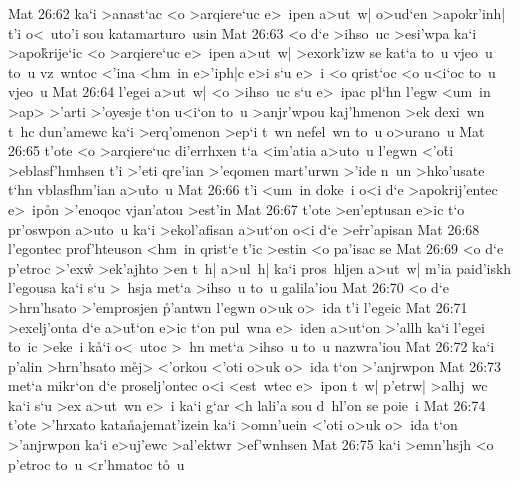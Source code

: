 \vs Mat 26:62
ka`i
>anast`ac
<o
>arqiere`uc
e>~ipen
a>ut~w|
o>ud`en
>apokr'inh|
t'i
o<~uto'i
sou
katamarturo~usin\bibvsend
\vs Mat 26:63
<o
d`e
>ihso~uc
>esi'wpa
ka`i
>apo\r{k}rije`ic
<o
>arqiere`uc
e>~ipen
a>ut~w|
>exork'izw
se
kat`a
to~u
vjeo~u
to~u
vz~wntoc
<'ina
<hm~in
e>'iph|c
e>i
s`u
e>~i
<o
qrist`oc
<o
u<i`oc
to~u
vjeo~u\bibvsend
\vs Mat 26:64
l'egei
a>ut~w|
<o
>ihso~uc
s`u
e>~ipac
pl`hn
l'egw
<um~in
>ap>
>'arti
>'oyesje
t`on
u<i`on
to~u
>anjr'wpou
kaj'hmenon
>ek
dexi~wn
t~hc
dun'amewc
ka`i
>erq'omenon
>ep`i
t~wn
nefel~wn
to~u
o>urano~u\bibvsend
\vs Mat 26:65
t'ote
<o
>arqiere`uc
di'errhxen
t`a
<im'atia
a>uto~u
l'egwn
<'o\r{t}i
>eblasf'hmhsen
t'i
>'eti
qre'ian
>'eqomen
mart'urwn
>'ide
n~un
>hko'usate
t`hn
vblasfhm'ian
a>u\r{t}o~u\bibvsend
{}
\vs Mat 26:66
t'i
<um~in
doke~i
o<i
d`e
>apokrij'entec
e>~ip\r{o}n
>'enoqoc
vjan'atou
>est'in\bibvsend
\vs Mat 26:67
t'ote
>en'eptusan
e>ic
t`o
pr'oswpon
a>uto~u
ka`i
>ekol'afisan
a>ut`on
o<i
d`e
>e\r{r}r'apisan\bibvsend
{}
\vs Mat 26:68
l'egontec
prof'hteuson
<hm~in
qrist`e
t'ic
>estin
<o
pa'isac
se\bibvsend
\vs Mat 26:69
<o
d`e
p'etroc
>'exw\r{}
>ek'ajhto
>en
t~h|
a>ul~h|
ka`i
pros~hljen
a>ut~w|
m'ia
paid'iskh
l'egousa
ka`i
s`u
>~hsja
met`a
>ihso~u
to~u
galila'iou\bibvsend
\vs Mat 26:70
<o
d`e
>hrn'hsato
>'emprosjen
\r{p}'antwn
l'egwn
o>uk
o>~ida
t'i
l'egeic\bibvsend
\vs Mat 26:71
>exelj'onta
d`e
a>u\r{t}`on
e>ic
t`on
pul~wna
e>~iden
a>ut`on
>'allh
ka`i
l'egei
\r{t}o~ic
>eke~i
k\r{a}`i
o<~utoc
>~hn
met`a
>ihso~u
to~u
nazwra'iou\bibvsend
\vs Mat 26:72
ka`i
p'alin
>hrn'hsato
m\r{e}j>
<'orkou
<'oti
o>uk
o>~ida
t`on
>'anjrwpon\bibvsend
\vs Mat 26:73
met`a
mikr`on
d`e
proselj'ontec
o<i
<est~wtec
e>~ipon
t~w|
p'etrw|
>alhj~wc
ka`i
s`u
>ex
a>ut~wn
e>~i
ka`i
g`ar
<h
lali'a
sou
d~hl'on
se
poie~i\bibvsend
\vs Mat 26:74
t'ote
>'hrxato
kata\r{n}ajemat'izein
ka`i
>omn'uein
<'oti
o>uk
o>~ida
t`on
>'anjrwpon
ka`i
e>uj'ewc
>al'ektwr
>ef'wnhsen\bibvsend
\vs Mat 26:75
ka`i
>emn'hsjh
<o
p'etroc
to~u
<r'hmatoc
t\r{o}~u
